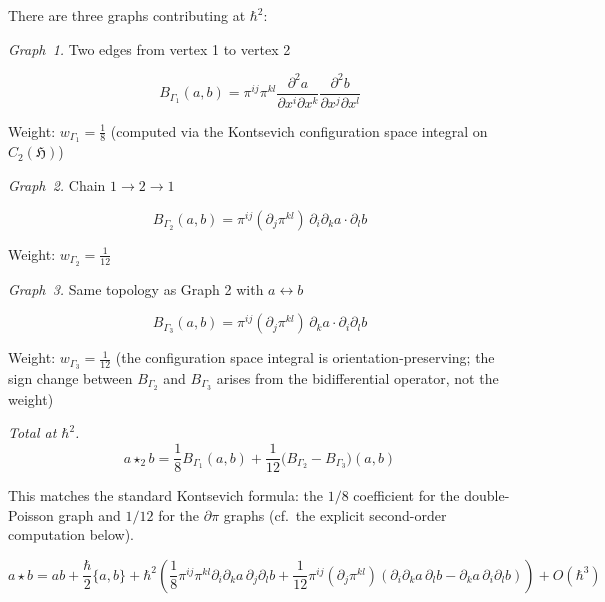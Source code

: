 There are three graphs contributing at $\hbar^2$:

\emph{Graph~1.} Two edges from vertex 1 to vertex 2
\begin{center}
\end{center}

\[B_{\Gamma_1}(a,b) = \pi^{ij} \pi^{kl} \frac{\partial^2 a}{\partial x^i \partial x^k} \frac{\partial^2 b}{\partial x^j \partial x^l}\]

Weight: $w_{\Gamma_1} = \frac{1}{8}$ (computed via the Kontsevich configuration space integral on $C_2(\mathfrak{H})$)

\emph{Graph~2.} Chain $1 \to 2 \to 1$
\begin{center}
\end{center}

\[B_{\Gamma_2}(a,b) = \pi^{ij} (\partial_j\pi^{kl})\, \partial_i\partial_k a \cdot \partial_l b\]

Weight: $w_{\Gamma_2} = \frac{1}{12}$

\emph{Graph~3.} Same topology as Graph 2 with $a \leftrightarrow b$

\[B_{\Gamma_3}(a,b) = \pi^{ij} (\partial_j\pi^{kl})\, \partial_k a \cdot \partial_i\partial_l b\]

Weight: $w_{\Gamma_3} = \frac{1}{12}$ (the configuration space integral is orientation-preserving; the sign change between $B_{\Gamma_2}$ and $B_{\Gamma_3}$ arises from the bidifferential operator, not the weight)

\emph{Total at $\hbar^2$.}
\[a \star_2 b = \frac{1}{8}B_{\Gamma_1}(a,b) + \frac{1}{12}\bigl(B_{\Gamma_2} - B_{\Gamma_3}\bigr)(a,b)\]

This matches the standard Kontsevich formula: the $1/8$ coefficient for the double-Poisson graph and $1/12$ for the $\partial\pi$ graphs (cf.\ the explicit second-order computation below).

\begin{theorem}
\label{thm:kontsevich-explicit-formula}
\[a \star b = ab + \frac{\hbar}{2}\{a,b\} + \hbar^2\!\left(\frac{1}{8}\pi^{ij}\pi^{kl}\partial_i\partial_k a\,\partial_j\partial_l b + \frac{1}{12}\pi^{ij}(\partial_j\pi^{kl})(\partial_i\partial_k a\,\partial_l b - \partial_k a\,\partial_i\partial_l b)\right) + O(\hbar^3)\]
\end{theorem}

